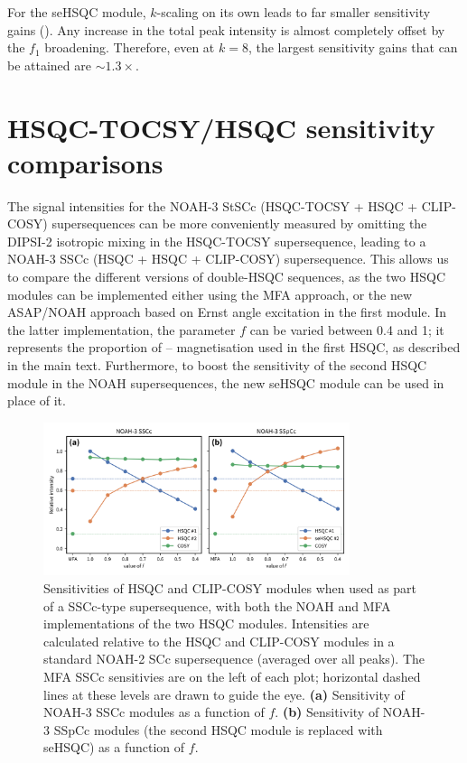 For the seHSQC module, $k$-scaling on its own leads to far smaller sensitivity gains ().
Any increase in the total peak intensity is almost completely offset by the $f_1$ broadening.
Therefore, even at $k = 8$, the largest sensitivity gains that can be attained are $\sim 1.3\times$.

\section{HSQC-TOCSY/HSQC sensitivity comparisons}

The signal intensities for the NOAH-3 StSCc (HSQC-TOCSY + HSQC + CLIP-COSY) supersequences can be more conveniently measured by omitting the DIPSI-2 isotropic mixing in the HSQC-TOCSY supersequence, leading to a NOAH-3 SSCc (HSQC + HSQC + CLIP-COSY) supersequence.
This allows us to compare the different versions of double-HSQC sequences, as the two HSQC modules can be implemented either using the MFA approach, or the new ASAP/NOAH approach based on Ernst angle excitation in the first module.
In the latter implementation, the parameter $f$ can be varied between 0.4 and 1; it represents the proportion of \carbon{}--\proton{} magnetisation used in the first HSQC, as described in the main text.
Furthermore, to boost the sensitivity of the second HSQC module in the NOAH supersequences, the new seHSQC module can be used in place of it.

\begin{figure}
    \centering
    \includegraphics[width=0.8\textwidth]{./figures/ssc_comparisons.png}
    \caption{
        Sensitivities of HSQC and CLIP-COSY modules when used as part of a SSCc-type supersequence, with both the NOAH and MFA implementations of the two HSQC modules.
        Intensities are calculated relative to the HSQC and CLIP-COSY modules in a standard NOAH-2 SCc supersequence (averaged over all peaks).
        The MFA SSCc sensitivies are on the left of each plot; horizontal dashed lines at these levels are drawn to guide the eye.
        \textbf{(a)} Sensitivity of NOAH-3 SSCc modules as a function of $f$.
        \textbf{(b)} Sensitivity of NOAH-3 SSpCc modules (the second HSQC module is replaced with seHSQC) as a function of $f$.
        \andro{}
    }
    \label{fig:ssc_comparisons}
\end{figure}


